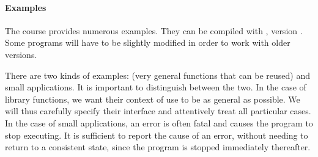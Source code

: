 \paragraph{Examples}

The course provides numerous examples. They can be compiled with
{\ocaml}, version {\ocamlversion}$\!\!\!$.  %
Some programs will have to be slightly modified in order to work with 
older versions.

There are two kinds of examples:  (very
general functions that can be reused) and small applications. It is
important to distinguish between the two. In the case of library functions, we
want their context of use to be as general as possible. We will thus
carefully specify their interface and attentively treat all
particular cases. In the case of small applications, an error is often
fatal and causes the program to stop executing. It is sufficient to report
the cause of an error, without needing to return to a consistent state, since
the program is stopped immediately thereafter.
